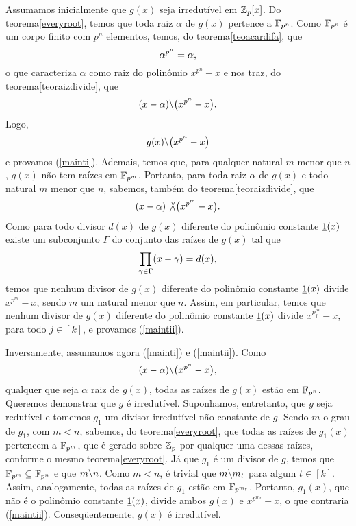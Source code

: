 \begin{prova}
  Assumamos inicialmente que $g(x)$ seja irredutível em $\mathbb{Z}_p[x]$.
  Do
  teorema\xspace\ref{everyroot}, temos que toda raiz $\alpha$ de $g(x)$
  pertence a
  $\mathbb{F}_{p^n}$. Como $\mathbb{F}_{p^n}$ é um corpo finito com $p^n$
  elementos, temos, do teorema\xspace\ref{teoacardifa}, que
  \begin{equation*}
    \alpha^{p^n} = \alpha\mathrm{,}
  \end{equation*}
  o que caracteriza $\alpha$ como raiz do polinômio $x^{p^n}-x$ e
  nos traz, do teorema\xspace\ref{teoraizdivide}, que
  \begin{equation*}
    (x-\alpha)\backslash \bigl(x^{p^n}-x\bigr)\mathrm{.}
  \end{equation*}
  Logo,
  \begin{equation*}
    g(x)\backslash \bigl(x^{p^n} -x\bigr)
  \end{equation*}
  e provamos (\ref{mainti}). Ademais, temos que,
  para qualquer natural $m$
  menor que $n$, $g(x)$ não tem raízes em $\mathbb{F}_{p^m}$. Portanto, para
  toda raiz $\alpha$ de $g(x)$ e todo natural $m$ menor que $n$,
  sabemos,
  também do teorema\xspace\ref{teoraizdivide},
  que
  \begin{equation*}
    (x-\alpha)\not{\backslash} \bigl(x^{p^m}-x\bigr)\mathrm{.}
  \end{equation*}
  Como para todo divisor $d(x)$ de $g(x)$ diferente do polinômio
  constante
  $\underline{1}(x)$
  existe um subconjunto $\Gamma$ do conjunto das raízes de $g(x)$
  tal que
  \begin{equation*}
    \prod_{\gamma\in\Gamma}(x-\gamma) = d(x)\mathrm{,}
  \end{equation*}
  temos que nenhum divisor de $g(x)$ diferente do polinômio constante
  $\underline{1}(x)$
  divide $x^{p^m}-x$, sendo $m$ um natural menor que $n$. Assim, em
  particular, temos que nenhum divisor de $g(x)$ diferente do polinômio
  constante $\underline{1}(x)$ divide $x^{p^m_j}-x$, para todo $j\in[k]$, e
  provamos (\ref{maintii}).

  Inversamente, assumamos agora (\ref{mainti}) e (\ref{maintii}). Como
  \begin{equation*}
    (x-\alpha)\backslash \bigl(x^{p^n}-x\bigr)\mathrm{,}
  \end{equation*}
  qualquer que seja $\alpha$ raiz de $g(x)$, todas as raízes de $g(x)$
  estão em $\mathbb{F}_{p^n}$. Queremos demonstrar que $g$ é
  irredutível. Suponhamos, entretanto, que $g$ seja redutível e tomemos
  $g_1$ um divisor irredutível não constante
  de $g$. Sendo $m$ o grau de $g_1$, com
  $m<n$, sabemos, do teorema\xspace\ref{everyroot},
  que todas as raízes de $g_1(x)$ pertencem a $\mathbb{F}_{p^m}$, que é
  gerado sobre $\mathbb{Z}_p$ por qualquer uma dessas raízes,
  conforme o mesmo teorema\xspace\ref{everyroot}.
  Já que $g_1$ é um divisor de $g$, temos que $\mathbb{F}_{p^m}\subseteq
  \mathbb{F}_{p^n}$ e que $m\backslash n$. Como $m<n$, é trivial que $m\backslash
  m_t$ para algum $t\in [k]$. Assim, analogamente, todas as
  raízes de $g_1$ estão em $\mathbb{F}_{p^{m_t}}$. Portanto, $g_1(x)$,
  que não é o polinômio constante $\underline{1}(x)$,
  divide ambos $g(x)$ e $x^{p^{m_t}}-x$,
  o que contraria
  (\ref{maintii}). Conseqüentemente, $g(x)$ é irredutível.
\end{prova}

